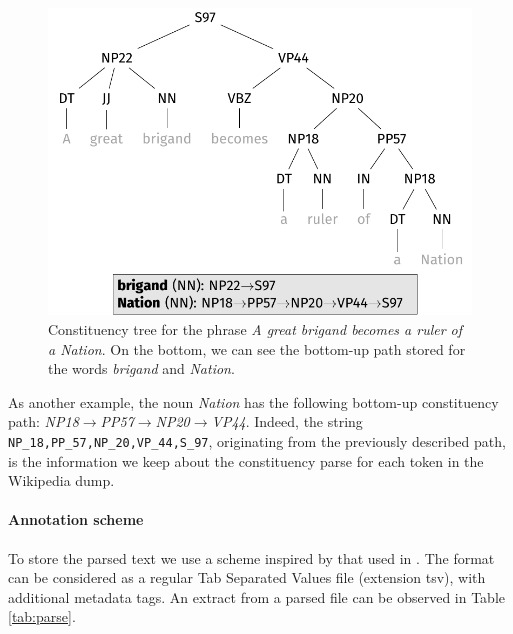\begin{figure}
\centering
\includegraphics[width=0.8\linewidth]{images/Chapitre3/trees/tree_saewd.pdf}
\caption{Constituency tree for the phrase \textit{A great brigand becomes a ruler of a Nation}. On the bottom, we can see the bottom-up path stored for the words \textit{brigand} and \textit{Nation}.}
\label{fig:tree_saewd}
\end{figure}
 


As another example, the noun \textit{Nation} has the following bottom-up constituency path: \textit{NP18}$\rightarrow$\textit{PP57}$\rightarrow$\textit{NP20}$\rightarrow $\textit{VP44}. Indeed, the string \texttt{NP\_18,PP\_57,NP\_20,VP\_44,S\_97}, originating from the previously described path,  is the information we keep about the constituency parse for each token in the Wikipedia dump.



\paragraph{Annotation scheme}\label{section3.2}
To store the parsed text we use a scheme  inspired by that used in \cite{ATSERIAS08}. The format can be considered as a regular Tab Separated Values file  (extension tsv), with additional metadata tags. An extract from a parsed file can be observed in Table \ref{tab:parse}. 

